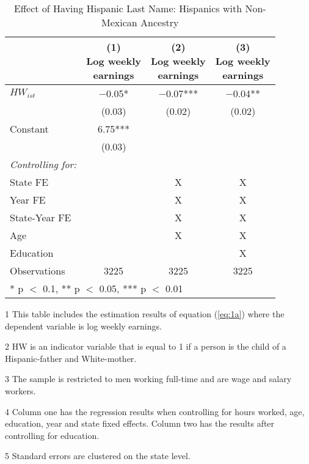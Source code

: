 \begin{table}[H]
\centering\centering
\caption{Effect of Having Hispanic Last Name: Hispanics with Non-Mexican Ancestry  \label{tab:lastnamereg-weekearm-nonmex}}
\centering
\begin{threeparttable}
\begin{tabular}[t]{lccc}
\toprule
  & \specialcell{(1) \\ Log weekly \\ earnings} & \specialcell{(2) \\ Log weekly \\ earnings} & \specialcell{(3) \\  Log weekly \\ earnings}\\
\midrule
$HW_{ist}$ & \num{-0.05}* & \num{-0.07}*** & \num{-0.04}**\\
 & (\num{0.03}) & (\num{0.02}) & (\num{0.02})\\
Constant & \num{6.75}*** &  & \\
 & (\num{0.03}) &  & \\
\midrule
\textit{Controlling for:} &  &  & \\
State FE &  & X & X\\
Year FE &  & X & X\\
State-Year FE &  & X & X\\
Age &  & X & X\\
Education &  &  & X\\
Observations & \num{3225} & \num{3225} & \num{3225}\\
\bottomrule
\multicolumn{4}{l}{\rule{0pt}{1em}* p $<$ 0.1, ** p $<$ 0.05, *** p $<$ 0.01}\\
\end{tabular}
\begin{tablenotes}
\item[1] {\footnotesize{This table includes the estimation results of equation (\ref{eq:1a}) where the dependent variable is log weekly earnings.}}
\item[2] {\footnotesize{HW is an indicator variable that is equal to 1 if a person is the child of a Hispanic-father and White-mother.}}
\item[3] {\footnotesize{The sample is restricted to men working full-time and are wage and salary workers.}}
\item[4] {\footnotesize{Column one has the regression results when controlling for hours worked, age, education, year and state fixed effects. Column two has the results after controlling for education.}}
\item[5] {\footnotesize{Standard errors are clustered on the state level.}}
\end{tablenotes}
\end{threeparttable}
\end{table}
